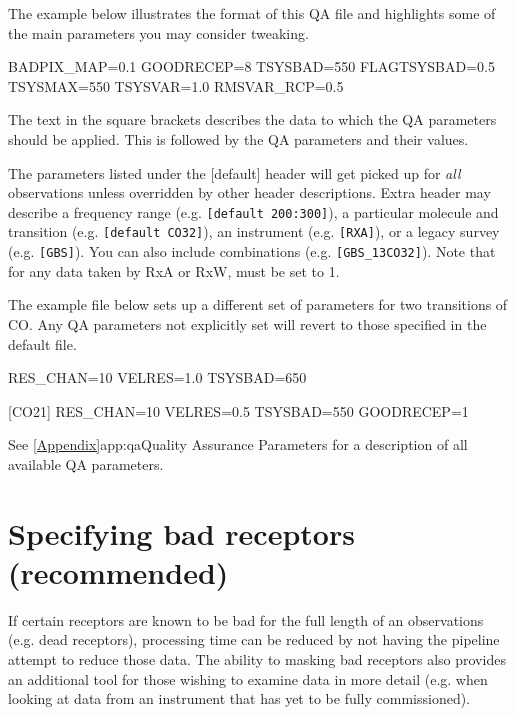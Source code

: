 \documentclass[11pt,oneside,chapters]{starlink}
\begin{document}
The example below illustrates the format of this QA file and
highlights some of the main parameters you may consider tweaking.

\vspace{0.2cm}
\begin{terminalv}
[default]
BADPIX_MAP=0.1
GOODRECEP=8
TSYSBAD=550
FLAGTSYSBAD=0.5
TSYSMAX=550
TSYSVAR=1.0
RMSVAR_RCP=0.5
\end{terminalv}
The text in the square brackets describes the data to which the QA
parameters should be applied. This is followed by the QA parameters
and their values.

The parameters listed under the [default] header will get picked up
for \textit{all} observations unless overridden by other header
descriptions. Extra header may describe a frequency range (e.g.
\texttt{[default 200:300]}), a particular molecule and transition
(e.g. \texttt{[default CO32]}), an instrument (e.g. \texttt{[RXA]}),
or a legacy survey (e.g. \texttt{[GBS]}). You can also include
combinations (e.g. \texttt{[GBS\_13CO32]}). Note that for any data
taken by RxA or RxW,  must be set to 1.

The example file below sets up a different set of parameters for two
transitions of CO. Any QA parameters not explicitly set will revert to
those specified in the default  file.

\vspace{0.2cm}
\begin{terminalv}
[C18O32]
RES_CHAN=10
VELRES=1.0
TSYSBAD=650

[CO21]
RES_CHAN=10
VELRES=0.5
TSYSBAD=550
GOODRECEP=1
\end{terminalv}

See \cref{Appendix}{app:qa}{Quality Assurance Parameters} for a
description of all available QA parameters.


\section{Specifying bad receptors (recommended)}
\label{sec:badrec}

If certain receptors are known to be bad for the full length of an
observations (e.g. dead receptors), processing time can be reduced by
not having the pipeline attempt to reduce those data. The ability to
masking bad receptors also provides an additional tool for those wishing
to examine data in more detail (e.g. when looking at data from an
instrument that has yet to be fully commissioned).
\end{document}
